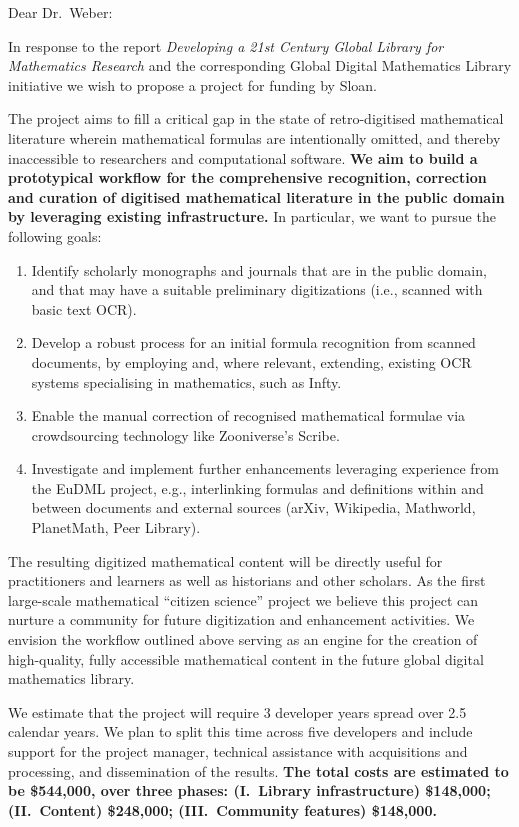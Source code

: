 \documentclass[10pt]{article}
\begin{document}
\thispagestyle{empty}

Dear Dr.~Weber:

In response to the report \emph{Developing a 21st Century Global Library
for Mathematics Research} and the corresponding Global Digital
Mathematics Library initiative we wish to propose a project 
for funding by Sloan.

The project aims to fill a critical gap
in the state of retro-digitised mathematical literature
wherein mathematical formulas are intentionally omitted, 
and thereby inaccessible to researchers and computational software.
\textbf{We aim to build a prototypical workflow for the comprehensive 
recognition, correction
and curation of digitised mathematical literature in the public domain 
by leveraging existing infrastructure.} In particular, we want to pursue 
the following goals:
\begin{enumerate}
\item Identify scholarly monographs and journals that are in the
  public domain, and that may have a suitable preliminary
  digitizations (i.e., scanned with basic text OCR).
\item Develop a robust process for an initial formula recognition from scanned 
documents, by employing and, where relevant, extending, existing OCR systems 
specialising in mathematics, such as {\sf Infty}.
\item Enable 
the manual correction of recognised mathematical formulae via crowdsourcing 
technology like Zooniverse's {\sf Scribe}.
\item Investigate and implement further enhancements leveraging
experience from the EuDML project, e.g., 
interlinking formulas and definitions within and between documents and
external sources  (arXiv, Wikipedia, Mathworld, PlanetMath, Peer 
Library).
\end{enumerate}
The resulting digitized mathematical content will be directly useful
for practitioners and learners as well as historians and other
scholars. As the first large-scale mathematical ``citizen science''
project we believe this project can nurture a community for future
digitization and enhancement activities.  We envision the workflow
outlined above serving as an engine for the creation of high-quality,
fully accessible mathematical content in the future global digital
mathematics library.

We estimate that the project will require 3 developer years spread over 2.5
calendar years.  We plan to split this time across five developers and
include support for the project manager, technical assistance with
acquisitions and processing, and dissemination of the results.
\textbf{The total costs are estimated to be \$544,000, over three phases:
(I.~Library infrastructure) \$148,000;
(II.~Content)               \$248,000;
(III.~Community features)   \$148,000.}
\end{document}
